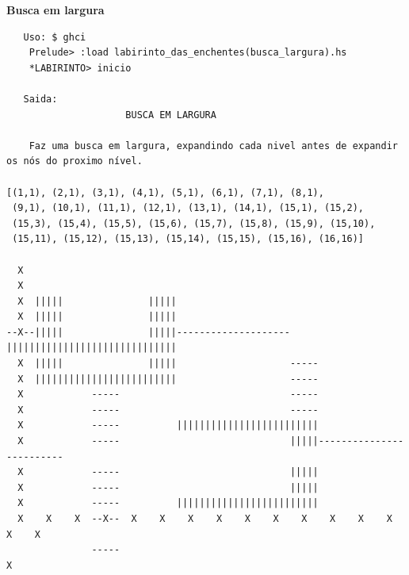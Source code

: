 \documentclass[10pt]{article}
\begin{document}
\vspace{3mm}
\textbf{Busca em largura} \\
\begin{verbatim}
   Uso: $ ghci
	Prelude> :load labirinto_das_enchentes(busca_largura).hs
	*LABIRINTO> inicio

   Saida:
		             BUSCA EM LARGURA

	Faz uma busca em largura, expandindo cada nivel antes de expandir os nós do proximo nível.

[(1,1), (2,1), (3,1), (4,1), (5,1), (6,1), (7,1), (8,1),
 (9,1), (10,1), (11,1), (12,1), (13,1), (14,1), (15,1), (15,2),
 (15,3), (15,4), (15,5), (15,6), (15,7), (15,8), (15,9), (15,10),
 (15,11), (15,12), (15,13), (15,14), (15,15), (15,16), (16,16)]

  X
  X
  X  |||||               |||||
  X  |||||               |||||
--X--|||||               |||||--------------------||||||||||||||||||||||||||||||
  X  |||||               |||||                    -----
  X  |||||||||||||||||||||||||                    -----
  X            -----                              -----
  X            -----                              -----
  X            -----          |||||||||||||||||||||||||
  X            -----                              |||||-------------------------
  X            -----                              |||||
  X            -----                              |||||
  X            -----          |||||||||||||||||||||||||
  X    X    X  --X--  X    X    X    X    X    X    X    X    X    X    X    X
       	       -----                                                         X

\end{verbatim}

\pagebreak
\end{document}
